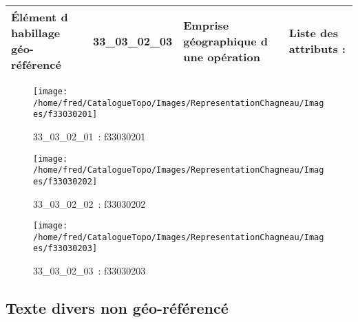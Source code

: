 \documentclass[12pt,titlepage]{book}
\begin{document}
\renewcommand{\arraystretch}{1.2}
\begin{supertabular}{|p{10cm}|c|p{13cm}|p{12cm}|}
 Élément d habillage géo-référencé & 33\_03\_02\_03 & Emprise géographique d une opération & Liste des attributs :
\begin{enumerate}
\end{enumerate}
\\
\hline
\end{supertabular}
\begin{figure}[h!]
  \hfill         %
  \begin{minipage}[t]{3cm}
    \begin{center}
      \texttt{[image: /home/fred/CatalogueTopo/Images/RepresentationChagneau/Images/f33030201]}
      \caption[~33\_03\_02\_01]{\small{33\_03\_02\_01~:} \tiny{f33030201}}\label{f33030201}
    \end{center}
  \end{minipage}
  \begin{minipage}[t]{3cm}
    \begin{center}
      \texttt{[image: /home/fred/CatalogueTopo/Images/RepresentationChagneau/Images/f33030202]}
      \caption[~33\_03\_02\_02]{\small{33\_03\_02\_02~:} \tiny{f33030202}}\label{f33030202}
    \end{center}
  \end{minipage}
  \begin{minipage}[t]{3cm}
    \begin{center}
      \texttt{[image: /home/fred/CatalogueTopo/Images/RepresentationChagneau/Images/f33030203]}
      \caption[~33\_03\_02\_03]{\small{33\_03\_02\_03~:} \tiny{f33030203}}\label{f33030203}
    \end{center}
  \end{minipage}
\end{figure}


\subsection{Texte divers non géo-référencé}
\noindent
\vspace{\baselineskip}
\end{document}

